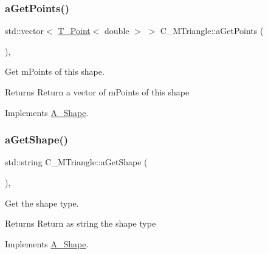 \subsubsection{\texorpdfstring{a\+Get\+Points()}{aGetPoints()}\hspace{0.1cm}{\footnotesize\ttfamily [2/2]}}
{\footnotesize\ttfamily std\+::vector$<$ \hyperlink{classT__Point}{T\+\_\+\+Point}$<$ double $>$ $>$ C\+\_\+\+M\+Triangle\+::a\+Get\+Points (\begin{DoxyParamCaption}{ }\end{DoxyParamCaption})\hspace{0.3cm}{\ttfamily [override]}, {\ttfamily [virtual]}}



Get m\+Points of this shape. 

\begin{DoxyReturn}{Returns}
Return a vector of m\+Points of this shape 
\end{DoxyReturn}


Implements \hyperlink{classA__Shape_a9fd1285bd63b1fc88943c9969bf01a5c}{A\+\_\+\+Shape}.

\mbox{\label{classC__MTriangle_aca7e38c6bf9695aacf54aa03ecfba978}} 
\subsubsection{\texorpdfstring{a\+Get\+Shape()}{aGetShape()}\hspace{0.1cm}{\footnotesize\ttfamily [1/2]}}
{\footnotesize\ttfamily std\+::string C\+\_\+\+M\+Triangle\+::a\+Get\+Shape (\begin{DoxyParamCaption}{ }\end{DoxyParamCaption})\hspace{0.3cm}{\ttfamily [override]}, {\ttfamily [virtual]}}



Get the shape type. 

\begin{DoxyReturn}{Returns}
Return as string the shape type 
\end{DoxyReturn}


Implements \hyperlink{classA__Shape_a1b202256a4e5dcb0edab4ab93a37122c}{A\+\_\+\+Shape}.

\mbox{\label{classC__MTriangle_aca7e38c6bf9695aacf54aa03ecfba978}} 
